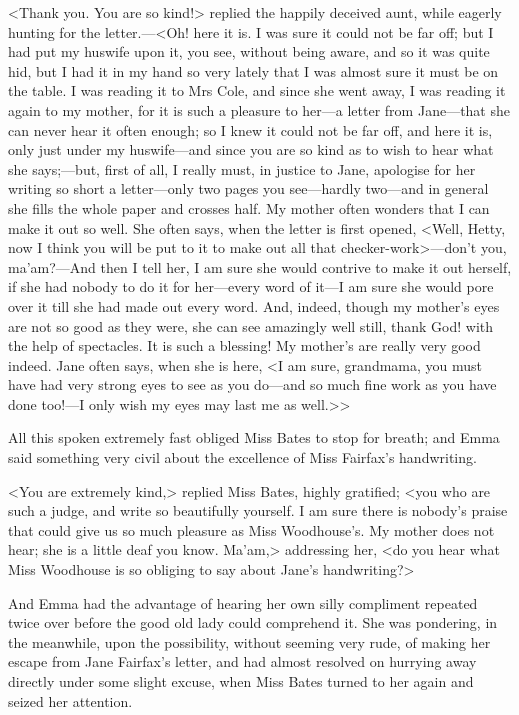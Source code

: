<Thank you. You are so kind!> replied the happily deceived aunt, while eagerly hunting for the letter.—<Oh! here it is. I was sure it could not be far off; but I had put my huswife upon it, you see, without being aware, and so it was quite hid, but I had it in my hand so very lately that I was almost sure it must be on the table. I was reading it to Mrs Cole, and since she went away, I was reading it again to my mother, for it is such a pleasure to her—a letter from Jane—that she can never hear it often enough; so I knew it could not be far off, and here it is, only just under my huswife—and since you are so kind as to wish to hear what she says;—but, first of all, I really must, in justice to Jane, apologise for her writing so short a letter—only two pages you see—hardly two—and in general she fills the whole paper and crosses half. My mother often wonders that I can make it out so well. She often says, when the letter is first opened, <Well, Hetty, now I think you will be put to it to make out all that checker-work>—don't you, ma'am?—And then I tell her, I am sure she would contrive to make it out herself, if she had nobody to do it for her—every word of it—I am sure she would pore over it till she had made out every word. And, indeed, though my mother's eyes are not so good as they were, she can see amazingly well still, thank God! with the help of spectacles. It is such a blessing! My mother's are really very good indeed. Jane often says, when she is here, <I am sure, grandmama, you must have had very strong eyes to see as you do—and so much fine work as you have done too!—I only wish my eyes may last me as well.>>

All this spoken extremely fast obliged Miss Bates to stop for breath; and Emma said something very civil about the excellence of Miss Fairfax's handwriting.

<You are extremely kind,> replied Miss Bates, highly gratified; <you who are such a judge, and write so beautifully yourself. I am sure there is nobody's praise that could give us so much pleasure as Miss Woodhouse's. My mother does not hear; she is a little deaf you know. Ma'am,> addressing her, <do you hear what Miss Woodhouse is so obliging to say about Jane's handwriting?>

And Emma had the advantage of hearing her own silly compliment repeated twice over before the good old lady could comprehend it. She was pondering, in the meanwhile, upon the possibility, without seeming very rude, of making her escape from Jane Fairfax's letter, and had almost resolved on hurrying away directly under some slight excuse, when Miss Bates turned to her again and seized her attention.

